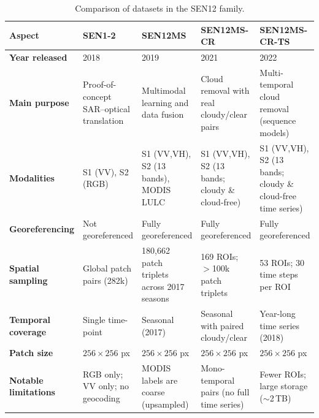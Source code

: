 \begin{table}[!h]
    \centering
    \caption{Comparison of datasets in the SEN12 family.}
    \label{tab:sen12_datasets}
    \setlength{\tabcolsep}{4pt} %
    \renewcommand{\arraystretch}{1.15} %
    \begin{adjustbox}{max width=\textwidth, keepaspectratio=false}
    \begin{tabular}{P{2.6cm} P{3.4cm} P{3.4cm} P{3.6cm} P{3.6cm}}
        \toprule
        \textbf{Aspect} &
        \textbf{SEN1-2}~\cite{sen12_2018} &
        \textbf{SEN12MS}~\cite{sen12ms_2019} &
        \textbf{SEN12MS-CR}~\cite{sen12ms-cr_2021} &
        \textbf{SEN12MS-CR-TS}~\cite{sen12ms-cr-ts_2022} \\
        \midrule
        \textbf{Year released} &
        2018 & 2019 & 2021 & 2022 \\
        \addlinespace[6pt]
        \textbf{Main purpose} &
        Proof-of-concept SAR–optical translation &
        Multimodal learning and data fusion &
        Cloud removal with real cloudy/clear pairs &
        Multi-temporal cloud removal (sequence models) \\
        \addlinespace[6pt]
        \textbf{Modalities} &
        S1 (VV), S2 (RGB) &
        S1 (VV,VH), S2 (13 bands), MODIS LULC &
        S1 (VV,VH), S2 (13 bands; cloudy \& cloud-free) &
        S1 (VV,VH), S2 (13 bands; cloudy \& cloud-free time series) \\
        \addlinespace[6pt]
        \textbf{Georeferencing} &
        Not georeferenced &
        Fully georeferenced &
        Fully georeferenced &
        Fully georeferenced \\
        \addlinespace[6pt]
        \textbf{Spatial sampling} &
        Global patch pairs (282k) &
        180,662 patch triplets across 2017 seasons &
        169 ROIs; $>$100k patch triplets &
        53 ROIs; 30 time steps per ROI \\
        \addlinespace[6pt]
        \textbf{Temporal coverage} &
        Single time-point &
        Seasonal (2017) &
        Seasonal with paired cloudy/clear &
        Year-long time series (2018) \\
        \addlinespace[6pt]
        \textbf{Patch size} &
        $256\times256$ px &
        $256\times256$ px &
        $256\times256$ px &
        $256\times256$ px \\
        \addlinespace[6pt]
        \textbf{Notable limitations} &
        RGB only; VV only; no geocoding &
        MODIS labels are coarse (upsampled) &
        Mono-temporal pairs (no full time series) &
        Fewer ROIs; large storage ($\sim$2\,TB) \\
        \bottomrule
    \end{tabular}
    \end{adjustbox}
\end{table}


